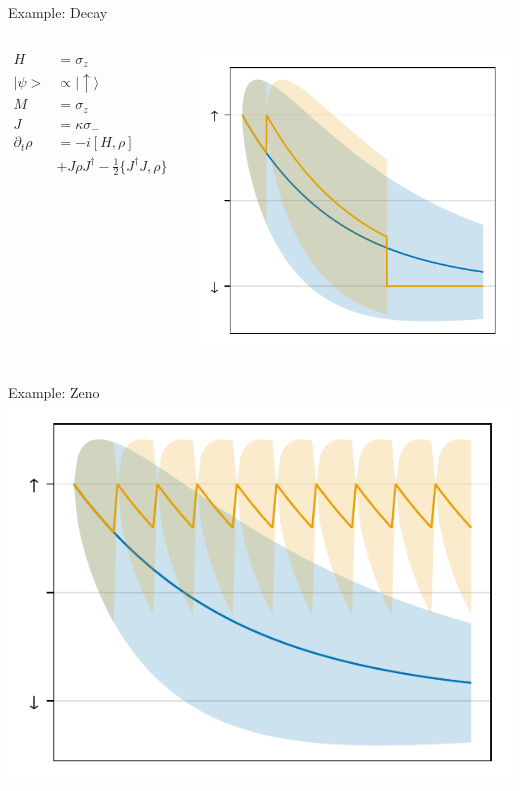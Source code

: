 \documentclass[
]{beamer}
\begin{document}
\begin{frame}{Example: Decay}
	\begin{columns}
		\begin{align*}
			H &= \sigma_z\\
			|\psi> &\propto |\uparrow\rangle\\
			M &= \sigma_z\\
			J &= \kappa\sigma_-\\
			\partial_t\rho &= -i [H, \rho] \\
			&+ J\rho J^\dagger - \frac{1}{2} \{J^\dagger J, \rho\} 
		\end{align*}
		
		\centering
		\vspace{-1cm}
		\includegraphics{figures/04 discreate.pdf}
	\end{columns}
\end{frame}

\begin{frame}{Example: Zeno}
	\centering
	\includegraphics{figures/04 discreate zeno.pdf}
\end{frame}
\end{document}
